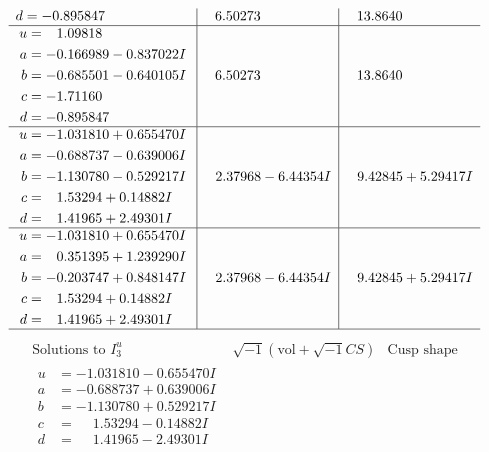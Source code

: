 \documentclass[1p]{elsarticle_modified}
\theoremstyle{definition}
\newcommand{\I}{\sqrt{-1}}
\begin{document}
$$\begin{array}{c|c|c}
\begin{aligned}
d &= -0.895847\phantom{ +0.000000I}\end{aligned}
 & \phantom{-}6.50273\phantom{ +0.000000I} & \phantom{-}13.8640\phantom{ +0.000000I} \\ \hline\begin{aligned}
u &= \phantom{-}1.09818\phantom{ +0.000000I} \\
a &= -0.166989 - 0.837022 I \\
b &= -0.685501 - 0.640105 I \\
c &= -1.71160\phantom{ +0.000000I} \\
d &= -0.895847\phantom{ +0.000000I}\end{aligned}
 & \phantom{-}6.50273\phantom{ +0.000000I} & \phantom{-}13.8640\phantom{ +0.000000I} \\ \hline\begin{aligned}
u &= -1.031810 + 0.655470 I \\
a &= -0.688737 - 0.639006 I \\
b &= -1.130780 - 0.529217 I \\
c &= \phantom{-}1.53294 + 0.14882 I \\
d &= \phantom{-}1.41965 + 2.49301 I\end{aligned}
 & \phantom{-}2.37968 - 6.44354 I & \phantom{-}9.42845 + 5.29417 I \\ \hline\begin{aligned}
u &= -1.031810 + 0.655470 I \\
a &= \phantom{-}0.351395 + 1.239290 I \\
b &= -0.203747 + 0.848147 I \\
c &= \phantom{-}1.53294 + 0.14882 I \\
d &= \phantom{-}1.41965 + 2.49301 I\end{aligned}
 & \phantom{-}2.37968 - 6.44354 I & \phantom{-}9.42845 + 5.29417 I\\
 \hline 
 \end{array}$$\newpage$$\begin{array}{c|c|c}  
\text{Solutions to }I^u_{3}& \I (\text{vol} + \sqrt{-1}CS) & \text{Cusp shape}\\
 \hline 
\begin{aligned}
u &= -1.031810 - 0.655470 I \\
a &= -0.688737 + 0.639006 I \\
b &= -1.130780 + 0.529217 I \\
c &= \phantom{-}1.53294 - 0.14882 I \\
d &= \phantom{-}1.41965 - 2.49301 I\end{aligned}

\end{array}$$
\end{document}
